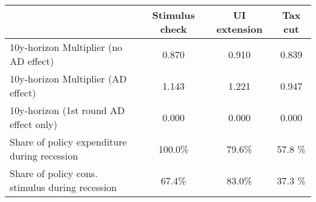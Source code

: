 \begin{tabular}{@{}lccc@{}} 
\toprule 
& Stimulus check    & UI extension    & Tax cut     \\  \midrule 
10y-horizon Multiplier (no AD effect) &0.870  & 0.910  & 0.839     \\ 
10y-horizon Multiplier (AD effect) &1.143  & 1.221  & 0.947     \\ 
10y-horizon (1st round AD effect only) &0.000  & 0.000  & 0.000     \\ 
Share of policy expenditure during recession &100.0\%  & 79.6\%  & 57.8 \%    \\ 
Share of policy cons. stimulus during recession &67.4\%  & 83.0\%  & 37.3 \%    \\ \bottomrule 
\end{tabular}  
